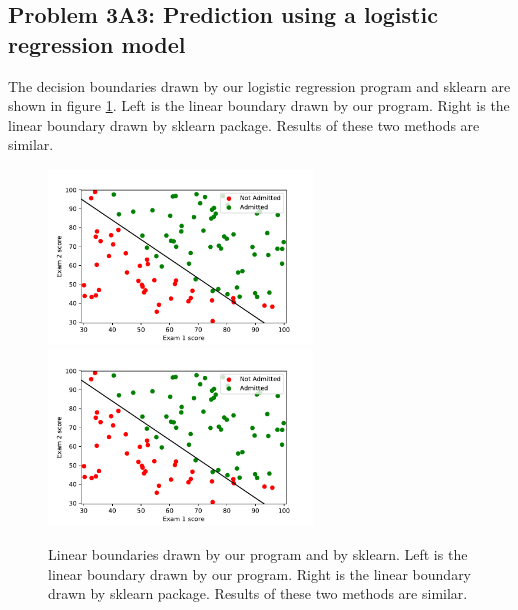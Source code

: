 \documentclass[]{book}
\theoremstyle{definition}
\begin{document}
\subsection*{Problem 3A3: Prediction using a logistic regression model}
The decision boundaries drawn by our logistic regression program and sklearn are shown in figure \ref{fig:boundary}. Left is the linear boundary drawn by our program. Right is the linear boundary drawn by sklearn package. Results of these two methods are similar.
\begin{figure}[H]
	\centering
	\includegraphics[width=7cm]{imgs//boundary_1.pdf}
	\includegraphics[width=7cm]{imgs//boundary_sk.pdf}
	\caption{Linear boundaries drawn by our program and by sklearn. Left is the linear boundary drawn by our program. Right is the linear boundary drawn by sklearn package. Results of these two methods are similar.}
	\label{fig:boundary}
\end{figure}
\end{document}
